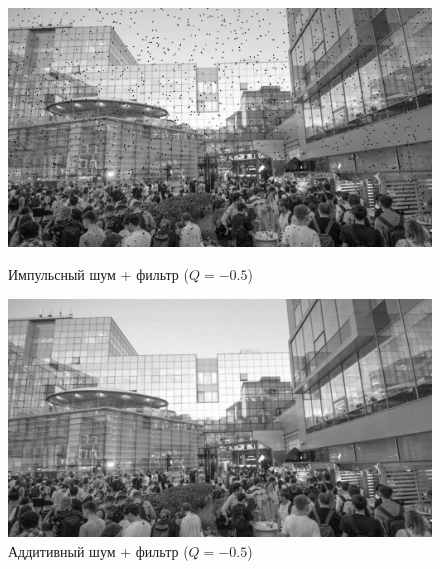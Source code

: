 \documentclass[a4paper]{article}
\begin{document}
\begin{figure}[H]
    \begin{minipage}{0.49\textwidth}
        \centering \includegraphics[width=\textwidth]{images/2_low_filters/impulse - contrharmonic (Q=-0.5).jpg}
        \caption{Импульсный шум + фильтр ($Q = -0.5$)}
    \end{minipage}\hfill
    \begin{minipage}{0.49\textwidth}
        \centering \includegraphics[width=\textwidth]{images/2_low_filters/additive - contrharmonic (Q=-0.5).jpg}
        \caption{Аддитивный шум + фильтр ($Q = -0.5$)}
    \end{minipage}
\end{figure}
\end{document}
